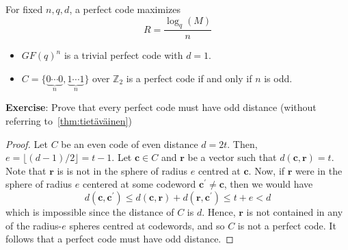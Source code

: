 For fixed $ n,q,d $, a perfect code maximizes
\[ R=\frac{\log_q(M)}{n} \]

\begin{Example}{}{}
    \begin{itemize}
        \item $ GF(q)^n $ is a trivial perfect code with $ d=1 $.
        \item $ C=\{\underbrace{0\cdots 0}_{n},\underbrace{1\cdots 1}_{n}\} $
              over $ \mathbb{Z}_2 $ is a perfect code if and only if $ n $ is odd.
    \end{itemize}
\end{Example}

\textbf{Exercise}: Prove that every perfect code must have odd distance
(without referring to~\ref{thm:tietäväinen})

\begin{proof}
    Let $ C $ be an even code of even distance $ d=2t $. Then, $ e=\lfloor(d-1)/2\rfloor=t-1 $.
    Let $ \bm{c}\in C $ and $ \bm{r} $ be a vector such that $ d(\bm{c},\bm{r})=t $.
    Note that $ \bm{r} $ is is not in the sphere of radius $ e $ centred at $ \bm{c} $.
    Now, if $ \bm{r} $ were in the sphere of radius $ e $ centered at some codeword
    $ \bm{c}^\prime\neq\bm{c} $, then we would have
    \[ d(\bm{c},\bm{c}^\prime)\leqslant d(\bm{c},\bm{r})+d(\bm{r},\bm{c}^\prime)\leqslant t+e
        <d \]
    which is impossible since the distance of $ C $ is $ d $. Hence, $ \bm{r} $ is not contained
    in any of the radius-$ e $ spheres centred at codewords, and so $ C $ is not
    a perfect code. It follows that a perfect code must have odd distance.
\end{proof}

